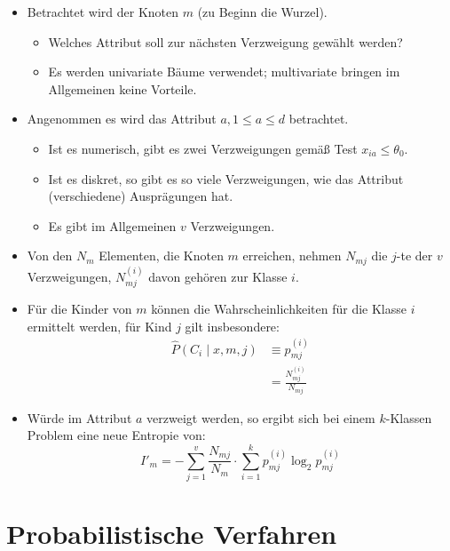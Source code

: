 \documentclass{scrartcl}
\begin{document}
\begin{itemize}
	\item Betrachtet wird der Knoten $ m $ (zu Beginn die Wurzel).
	\begin{itemize}
		\item Welches Attribut soll zur nächsten Verzweigung gewählt werden?
		\item Es werden univariate Bäume verwendet; multivariate bringen im 
		Allgemeinen keine Vorteile.
	\end{itemize}
	\item Angenommen es wird das Attribut $ a, 1 \leq a \leq d $ betrachtet.
	\begin{itemize}
		\item Ist es numerisch, gibt es zwei Verzweigungen gemäß Test $ x_{ia} 
		\leq \theta_0 $.
		\item Ist es diskret, so gibt es so viele Verzweigungen, wie das 
		Attribut (verschiedene) Ausprägungen hat.
		\item Es gibt im Allgemeinen $ v $ Verzweigungen.
	\end{itemize}
	\item Von den $ N_m $ Elementen, die Knoten $ m $ erreichen, nehmen $ 
	N_{mj} $ die $ j $-te der $ v $ Verzweigungen, $ N_{mj}^{(i)} $ davon 
	gehören zur Klasse $ i $.
	\item Für die Kinder von $ m $ können die Wahrscheinlichkeiten für die 
	Klasse $ i $ ermittelt werden, für Kind $ j $ gilt insbesondere:
	\begin{align*}
		\hat{P}(C_i \mid x,m,j) &\equiv p_{mj}^{(i)} \\
		&= \frac{N_{mj}^{(i)}}{N_{mj}}
	\end{align*}
	\item Würde im Attribut $ a $ verzweigt werden, so ergibt sich bei einem $ 
	k $-Klassen Problem eine neue Entropie von:
	\[ I'_m = -\sum_{j=1}^{v} \frac{N_{mj}}{N_m} \cdot \sum_{i=1}^{k} 
	p_{mj}^{(i)} \log_2 p_{mj}^{(i)} \]
\end{itemize}

\section{Probabilistische Verfahren}
\end{document}
